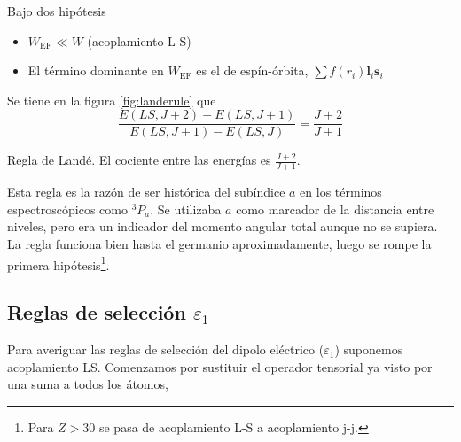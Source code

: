 \begin{regla*}
Bajo dos hipótesis
\begin{itemize}
\item $W_\text{EF}\ll W$ (acoplamiento L-S)
\item El término dominante en $W_\text{EF}$ es el de espín-órbita, $\sum f(r_i)\mathbf{l}_i \mathbf{s}_i$
\end{itemize}
Se tiene en la figura \ref{fig:landerule} que
\begin{equation}
  \frac{E(LS,J+2)-E(LS,J+1)}{E(LS,J+1)-E(LS,J)} = \frac{J+2}{J+1}
\end{equation}
\end{regla*}
\begin{marginfigure}
    \centering
    \caption{Regla de Landé. El cociente entre las energías es $\frac{J+2}{J+1}$.}
    \label{fig:landerule}
  \end{marginfigure}

Esta regla es la razón de ser histórica del subíndice $a$ en los términos
espectroscópicos como ${}^3 P_a$. Se utilizaba $a$ como marcador de la distancia
entre niveles, pero era un indicador del momento angular total aunque
no se supiera.
La regla funciona bien hasta el germanio aproximadamente, luego se rompe la
primera hipótesis\footnote{Para $Z>30$ se pasa de acoplamiento L-S a acoplamiento
j-j.}.

\subsection{Reglas de selección $\varepsilon_1$}
Para averiguar las reglas de selección del dipolo eléctrico
($\varepsilon_1$) suponemos acoplamiento LS. Comenzamos por sustituir
el operador tensorial ya visto por una suma a todos los átomos,

